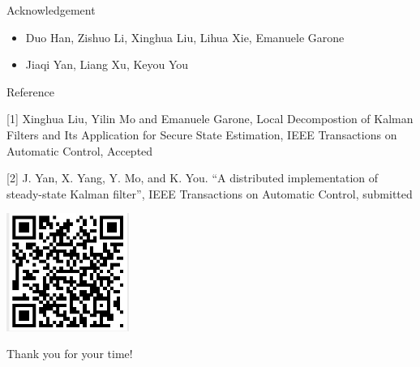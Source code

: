 \documentclass[10pt]{beamer}
\DeclareMathOperator{\1}{\textbf{1}}
\begin{document}
\begin{frame}{Acknowledgement}
  \begin{itemize}
    \item Duo Han, Zishuo Li, Xinghua Liu, Lihua Xie, Emanuele Garone
    \item Jiaqi Yan, Liang Xu, Keyou You
  \end{itemize}
\end{frame}

\begin{frame}{Reference}

  [1] Xinghua Liu, Yilin Mo and Emanuele Garone, Local Decompostion of Kalman Filters and Its Application for Secure State Estimation, IEEE Transactions on Automatic Control, Accepted

  [2] J. Yan, X. Yang, Y. Mo, and K. You. ``A distributed implementation of steady-state Kalman filter'', IEEE Transactions on Automatic Control, submitted

  \vspace{10pt}
  \centering
  \includegraphics[width=0.3\textwidth]{pic/qr.jpeg}
\end{frame}

\begin{frame}[standout]
  Thank you for your time! 
\end{frame}
\end{document}
